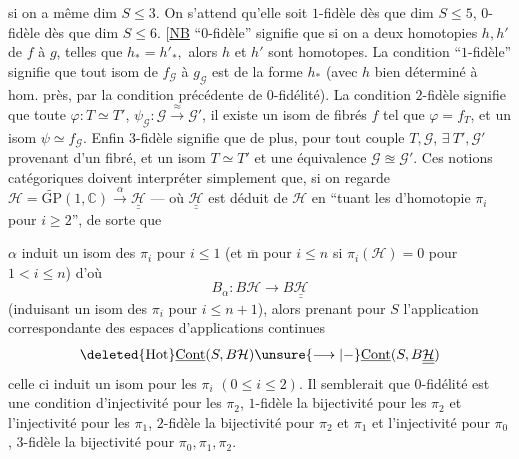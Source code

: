 si on a même dim $S\leq3$. On s'attend qu'elle
soit $1$-fidèle dès que dim $S\leq5$, $0$-fidèle
dès que dim $S\leq6$.
[\uline{NB}  ``$0$-fidèle'' signifie
que si  on a deux homotopies $h,h'$ de $f$ à $g$,
telles que $h_*=h'_*,$ alors $h$ et $h'$ sont homotopes.
La condition ``$1$-fidèle'' signifie  que tout
isom de $f_{\mathcal G}$ à $g_{\mathcal G}$
 est de la
forme $h_*$ (avec $h$ bien déterminé à hom. près,
par la condition précédente de $0$-fidélité). La
condition $2$-fidèle signifie que  toute
 $\varphi:T\simeq T'$,
$\psi_{\mathcal G}:\mathcal G\xrightarrow{\approx}\mathcal G'$,
il existe
un isom de fibrés $f$ tel que $\varphi=f_T$,
et un isom $\psi\simeq f_{\mathcal G}$. Enfin $3$-fidèle signifie
que de plus, pour tout couple $T,\mathcal G$,
$\exists\ T',\mathcal G'$ provenant d'un fibré, 
et un isom $T\simeq T'$ et une équivalence
$\mathcal G\approxeq\mathcal G'$. Ces notions catégoriques
doivent interpréter simplement que, si
on regarde $\mathcal H=\widetilde{\mathrm{GP}}(1,\mathbb C)
\xrightarrow{\alpha}\underline{\underline{\mathcal H}}$
--- où $\underline{\underline{\mathcal H}}$
est déduit de $\mathcal H$ en ``tuant les 
d'homotopie $\pi_i$ pour $i\geq2$'', de sorte que

$\alpha$ induit un isom des $\pi_i$ pour $i\leq1$
(et $\overline{\mathrm m}$ pour $i\leq n$ si
$\pi_i(\mathcal H)=0$ pour $1<i\leq n$)
 d'où
\[
B_\alpha:B\mathcal H\longrightarrow B\underline{\underline{\mathcal H}}
\]
(induisant un isom des $\pi_i$ pour $i\leq n+1$),
alors prenant pour   $S$ l'application
correspondante des espaces d'applications continues
\[
\deleted{\mathrm{Hot}}
\underline{\mathrm{Cont}}(S,B\mathcal H)
\unsure{\longrightarrow|{-}}
\underline{\mathrm{Cont}}(S,B\underline{\underline{\mathcal H}})
\]
celle ci induit un isom pour les
$\pi_i$ $(0\leq i\leq2)$.  Il semblerait que
$0$-fidélité est une condition d'injectivité
pour les $\pi_2$, $1$-fidèle la bijectivité pour les
$\pi_2$ et l'injectivité pour les $\pi_1$, $2$-fidèle
la bijectivité pour $\pi_2$ et $\pi_1$ et l'injectivité
pour $\pi_0$, $3$-fidèle la bijectivité pour $\pi_0,\pi_1,\pi_2$.

